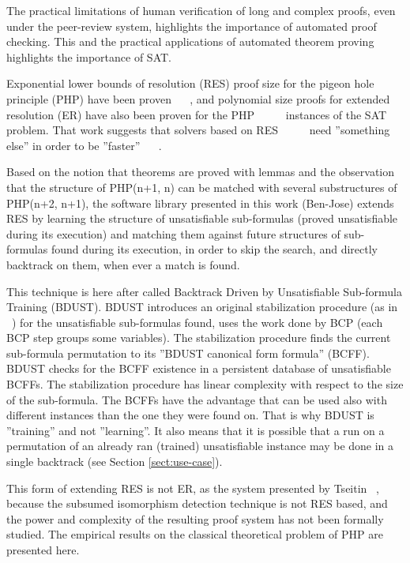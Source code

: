 \documentclass{easychair}
\begin{document}
The practical limitations of human verification of long and complex proofs, even under the peer-review system, highlights the importance of automated proof checking. This and the practical applications of automated theorem proving ~\cite{cadar-08} highlights the importance of SAT.

Exponential lower bounds of resolution (RES) proof size for the pigeon hole principle (PHP) have been proven ~\cite{haken-85} ~\cite{buss-88}, and polynomial size proofs for extended resolution (ER) have also been proven for the PHP  ~\cite{cook-76} ~\cite{cook-79} ~\cite{jarvisalo-07} instances of the SAT problem. That work suggests that solvers based on RES ~\cite{silva-95} ~\cite{moskewicz-01} ~\cite{een-04} need ''something else'' in order to be ''faster'' ~\cite{dixon-04} ~\cite{audemard-10}. 

Based on the notion that theorems are proved with lemmas and the observation that the structure of PHP(n+1, n) can be matched with several substructures of PHP(n+2, n+1), the software library presented in this work (Ben-Jose) extends RES by learning the structure of unsatisfiable sub-formulas (proved unsatisfiable during its execution) and matching them against future structures of sub-formulas found during its execution, in order to skip the search, and directly backtrack on them, when ever a match is found. 

This technique is here after called Backtrack Driven by Unsatisfiable Sub-formula Training (BDUST). BDUST introduces an original stabilization procedure (as in ~\cite{bastert-02}) for the unsatisfiable sub-formulas found, uses the work done by BCP (each BCP step groups some variables). The stabilization procedure finds the current sub-formula permutation to its ''BDUST canonical form formula'' (BCFF). BDUST checks for the BCFF existence in a persistent database of unsatisfiable BCFFs. The stabilization procedure has linear complexity with respect to the size of the sub-formula. The BCFFs have the advantage that can be used also with different instances than the one they were found on. That is why BDUST is ''training'' and not ''learning''. It also means that it is possible that a run on a permutation of an already ran (trained) unsatisfiable instance may be done in a single backtrack (see Section \ref{sect:use-case}).

This form of extending RES is not ER, as the system presented by Tseitin ~\cite{tseitin-83}, because the subsumed isomorphism detection technique is not RES based, and the power and complexity of the resulting proof system has not been formally studied. The empirical results on the classical theoretical problem of PHP are presented here. 
\end{document}
